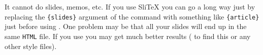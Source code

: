 \begin{htmllist}
\item [It cannot do slides, memos, etc. ]
If you use Sli\TeX{} you can go a long way just by replacing
the \verb|{slides}| argument of the  command with
something like \verb|{article}| just before using \latextohtml.
One problem may be that all your slides will end up in the  same \texttt{HTML}
file.
If you use  you may get much better results
(
to find this or any other style files).
\end{htmllist}

